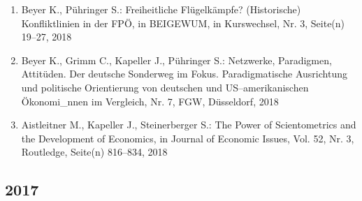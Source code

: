 \begin{enumerate}
	 \item Beyer K., Pühringer S.: Freiheitliche Flügelkämpfe? (Historische) Konfliktlinien in der FPÖ, in BEIGEWUM, in Kurswechsel, Nr. 3, Seite(n) 19--27, 2018
	 \item Beyer K., Grimm C., Kapeller J., Pühringer S.: Netzwerke, Paradigmen, Attitüden. Der deutsche Sonderweg im Fokus. Paradigmatische Ausrichtung und politische Orientierung von deutschen und US--amerikanischen Ökonomi\_nnen im Vergleich, Nr. 7, FGW, Düsseldorf, 2018
	 \item Aistleitner M., Kapeller J., Steinerberger S.: The Power of Scientometrics and the Development of Economics, in Journal of Economic Issues, Vol. 52, Nr. 3, Routledge, Seite(n) 816--834, 2018
\end{enumerate}
\subsection*{2017}
